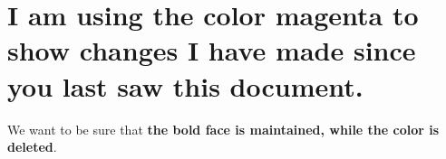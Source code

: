 \documentclass[11pt]{article}
\begin{document}
 

\section*{I am using the color magenta to show changes I have made since you last saw this document.} 

We want to be sure that \textbf{the bold face is maintained, while the color is deleted}. 
\end{document}
